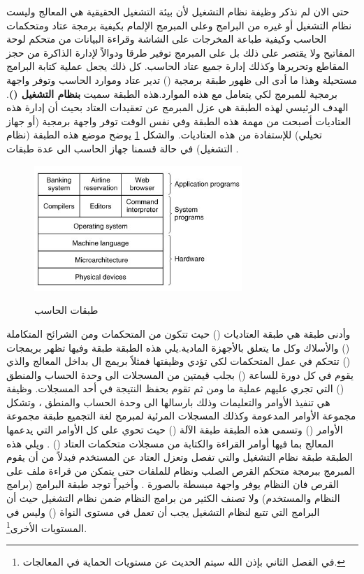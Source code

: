 \documentclass[document.tex]{subfiles}
\begin{document}
حتى الان لم نذكر وظيفة نظام التشغيل لأن بيئة التشغيل الحقيقية هي المعالج وليست نظام التشغيل أو غيره من البرامج وعلى المبرمج الإلمام بكيفية برمجة عتاد ومتحكمات الحاسب وكيفية طباعة المخرجات على الشاشة وقراءة البيانات من متحكم لوحة المفاتيح ولا يقتصر على ذلك بل على المبرمج توفير طرقا ودوالاً لإدارة الذاكرة من حجز المقاطع وتحريرها وكذلك إدارة جميع عتاد الحاسب. كل ذلك يجعل عملية كتابة البرامج مستحيلة وهذا ما أدى الى ظهور طبقة برمجية () تدير عتاد وموارد الحاسب وتوفر واجهة برمجية للمبرمج لكي يتعامل مع هذه الموارد.هذه الطبقة سميت \textbf{بنظام التشغيل ()}. الهدف الرئيسي لهذه الطبقة هي عزل المبرمج عن تعقيدات العتاد بحيث أن إدارة هذه العتاديات أصبحت من مهمة هذه الطبقة وفي نفس الوقت توفر واجهة برمجية (أو جهاز تخيلي) للإستفادة من هذه العتاديات. والشكل \ref{fig:computer_layer} يوضح موضع هذه الطبقة (نظام التشغيل) في حالة قسمنا جهاز الحاسب الى عدة طبقات \cite{2}.
\begin{figure}[h!] 
  \caption{طبقات الحاسب}
  \centering
   \includegraphics[width=0.7\textwidth]{../img/computer_layer}
 \label{fig:computer_layer} 
\end{figure}
وأدنى طبقة هي طبقة العتاديات () حيث تتكون من المتحكمات ومن الشرائح المتكاملة () والأسلاك وكل ما يتعلق بالأجهزة المادية.يلي هذه الطبقة طبقة  وفيها تظهر بريمجات () تتحكم في عمل المتحكمات لكي تؤدي وظيفتها فمثلاً بريمج ال  بداخل المعالج والذي يقوم في كل دورة للساعة () بجلب قيمتين من المسجلات الى وحدة الحساب والمنطق () التي تجري عليهم عملية ما ومن ثم تقوم بحفظ النتيجة في أحد المسجلات. وظيفة  هي تنفيذ الأوامر والتعليمات وذلك بارسالها الى وحدة الحساب والمنطق ، وتشكل مجموعة الأوامر المدعومة وكذلك المسجلات المرئية لمبرمج لغة التجميع طبقة مجموعة الأوامر () وتسمى هذه الطبقة طبقة الآلة () حيث تحوي على كل الأوامر التي يدعمها المعالج بما فيها أوامر القراءة والكتابة من مسجلات متحكمات العتاد () . ويلي هذه الطبقة طبقة نظام التشغيل والتي تفصل وتعزل العتاد عن المستخدم فبدلاً من أن يقوم المبرمج ببرمجة متحكم القرص الصلب ونظام للملفات حتى يتمكن من قراءة ملف على القرص فان النظام يوفر واجهة مبسطة  بالصورة . وأخيراً توجد طبقة البرامج (برامج النظام والمستخدم)  ولا تصنف الكثير من برامج النظام ضمن نظام التشغيل حيث أن البرامج التي تتبع لنظام التشغيل يجب أن تعمل في مستوى النواة () وليس في المستويات الأخرى\footnote{في الفصل الثاني بإذن الله سيتم الحديث عن مستويات الحماية في المعالجات.}.  
\end{document}
